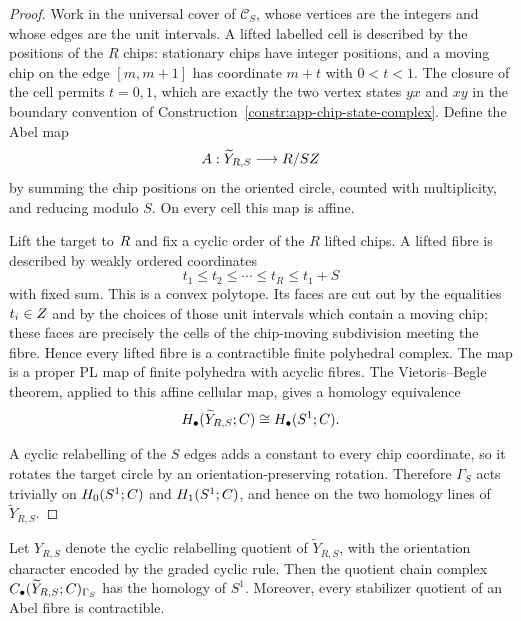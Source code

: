 \begin{proof}
  Work in the universal cover of \(\mathscr C_S\), whose vertices are the integers and
  whose edges are the unit intervals.  A lifted labelled cell is described by
  the positions of the \(R\) chips: stationary chips have integer positions,
  and a moving chip on the edge \([m,m+1]\) has coordinate \(m+t\) with
  \(0<t<1\).  The closure of the cell permits \(t=0,1\), which are exactly the
  two vertex states \(yx\) and \(xy\) in the boundary convention of
  Construction~\ref{constr:app-chip-state-complex}.  Define the Abel map
  \[
    A:\widetilde Y_{R,S}\longrightarrow R/SZ
  \]
  by summing the chip positions on the oriented circle, counted with
  multiplicity, and reducing modulo \(S\).  On every cell this map is affine.

  Lift the target to \(R\) and fix a cyclic order of the \(R\) lifted chips.
  A lifted fibre is described by weakly ordered coordinates
  \[
    t_1\leq t_2\leq\cdots\leq t_R\leq t_1+S
  \]
  with fixed sum.  This is a convex polytope.  Its faces are cut out by the
  equalities \(t_i\in Z\) and by the choices of those unit intervals which
  contain a moving chip; these faces are precisely the cells of the
  chip-moving subdivision meeting the fibre.  Hence every lifted fibre is a
  contractible finite polyhedral complex.  The map is a proper PL map of
  finite polyhedra with acyclic fibres.  The Vietoris--Begle theorem, applied
  to this affine cellular map, gives a homology equivalence
  \[
    H_\bullet(\widetilde Y_{R,S};C)\cong H_\bullet(S^1;C).
  \]

  A cyclic relabelling of the \(S\) edges adds a constant to every chip
  coordinate, so it rotates the target circle by an orientation-preserving
  rotation.  Therefore \(\Gamma_S\) acts trivially on
  \(H_0(S^1;C)\) and \(H_1(S^1;C)\), and hence on the two homology lines of
  \(\widetilde Y_{R,S}\).
\end{proof}

\begin{lem}
\label{lem:app-cyclic-abel-stabilizers}
  Let \(Y_{R,S}\) denote the cyclic relabelling quotient of
  \(\widetilde Y_{R,S}\), with the orientation character encoded by the
  graded cyclic rule.  Then the quotient chain complex
  \(C_\bullet(\widetilde Y_{R,S};C)_{\Gamma_S}\) has the homology of \(S^1\).
  Moreover, every stabilizer quotient of an Abel fibre is contractible.
\end{lem}

